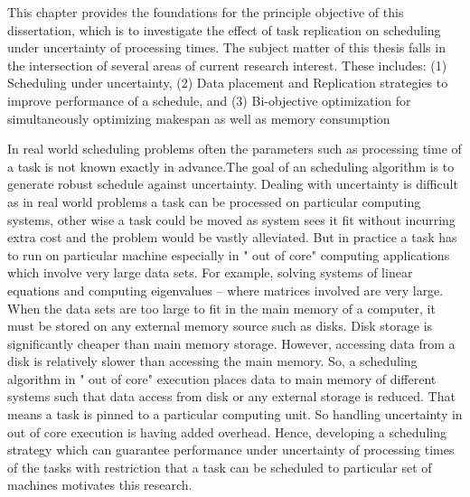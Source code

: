 \label{sec4}
\label{Intro}

This chapter provides the foundations for the principle objective of this dissertation,
which is to investigate the effect of task replication on scheduling under uncertainty of processing times.  The subject matter of this thesis falls in the intersection of several areas of current research interest.  These includes: (1)  Scheduling under uncertainty, (2) Data placement and Replication strategies to improve performance of a schedule, and (3) Bi-objective optimization for simultaneously optimizing makespan as well as memory consumption


In real world scheduling problems often the parameters such as processing time of a task is not known exactly in advance.The goal of an scheduling algorithm is to generate robust schedule against uncertainty. Dealing with uncertainty is difficult as in real world problems a task can be processed on particular computing systems, other wise a task could be moved as system sees it fit without incurring extra cost and the problem would be vastly alleviated. But in practice a task has to run on particular machine especially in " out of core" computing applications which involve very large data sets. For example, solving systems of linear equations and computing eigenvalues – where matrices involved are very large. When the data sets are too large to fit in the main memory of a computer, it must be stored on any external memory source such as disks. Disk storage is significantly cheaper than main memory storage. However, accessing data from a disk is relatively slower than accessing the main memory. So, a scheduling algorithm in " out of core" execution places data to main memory of different systems such that data access from disk or any external storage is reduced. That means a task is pinned to a particular computing unit. So handling uncertainty in out of core execution is having added overhead. Hence, developing a scheduling strategy which can guarantee performance under uncertainty of processing times of the tasks with restriction that a task can be scheduled to particular set of machines motivates this research.

